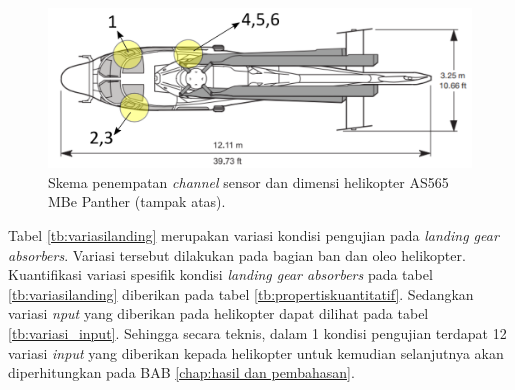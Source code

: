 \begin{figure}[H]
	\centering
	\includegraphics[width=0.7\linewidth]{gambar/tampak_atas.png}
	\caption{Skema penempatan \textit{channel} sensor dan dimensi helikopter AS565 MBe Panther (tampak atas).}
	\label{tampak_atas.png}
\end{figure}

Tabel \ref{tb:variasilanding} merupakan variasi kondisi pengujian pada \textit{landing gear absorbers}. Variasi tersebut dilakukan pada bagian ban dan oleo helikopter. Kuantifikasi variasi spesifik kondisi \textit{landing gear absorbers} pada tabel \ref{tb:variasilanding} diberikan pada tabel \ref{tb:propertiskuantitatif}. Sedangkan variasi \textit{nput} yang diberikan pada helikopter dapat dilihat pada tabel \ref{tb:variasi_input}. Sehingga secara teknis, dalam 1 kondisi pengujian terdapat 12 variasi \textit{input} yang diberikan kepada helikopter untuk kemudian selanjutnya akan diperhitungkan pada BAB \ref{chap:hasil dan pembahasan}.

